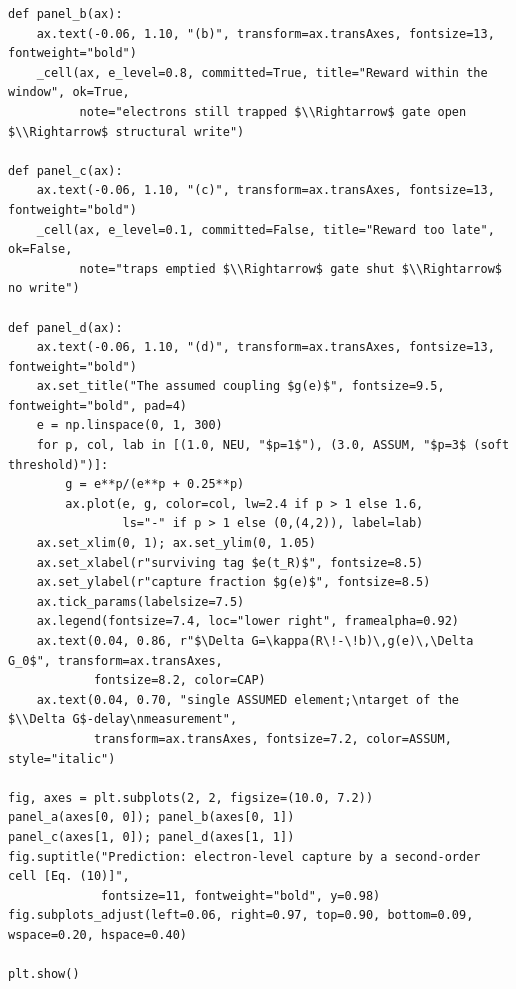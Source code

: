 \begin{lstlisting}[caption={schematics.ipynb code cell 3},label={lst:mrl-nb-schematics-3}]
def panel_b(ax):
    ax.text(-0.06, 1.10, "(b)", transform=ax.transAxes, fontsize=13, fontweight="bold")
    _cell(ax, e_level=0.8, committed=True, title="Reward within the window", ok=True,
          note="electrons still trapped $\\Rightarrow$ gate open $\\Rightarrow$ structural write")

def panel_c(ax):
    ax.text(-0.06, 1.10, "(c)", transform=ax.transAxes, fontsize=13, fontweight="bold")
    _cell(ax, e_level=0.1, committed=False, title="Reward too late", ok=False,
          note="traps emptied $\\Rightarrow$ gate shut $\\Rightarrow$ no write")

def panel_d(ax):
    ax.text(-0.06, 1.10, "(d)", transform=ax.transAxes, fontsize=13, fontweight="bold")
    ax.set_title("The assumed coupling $g(e)$", fontsize=9.5, fontweight="bold", pad=4)
    e = np.linspace(0, 1, 300)
    for p, col, lab in [(1.0, NEU, "$p=1$"), (3.0, ASSUM, "$p=3$ (soft threshold)")]:
        g = e**p/(e**p + 0.25**p)
        ax.plot(e, g, color=col, lw=2.4 if p > 1 else 1.6,
                ls="-" if p > 1 else (0,(4,2)), label=lab)
    ax.set_xlim(0, 1); ax.set_ylim(0, 1.05)
    ax.set_xlabel(r"surviving tag $e(t_R)$", fontsize=8.5)
    ax.set_ylabel(r"capture fraction $g(e)$", fontsize=8.5)
    ax.tick_params(labelsize=7.5)
    ax.legend(fontsize=7.4, loc="lower right", framealpha=0.92)
    ax.text(0.04, 0.86, r"$\Delta G=\kappa(R\!-\!b)\,g(e)\,\Delta G_0$", transform=ax.transAxes,
            fontsize=8.2, color=CAP)
    ax.text(0.04, 0.70, "single ASSUMED element;\ntarget of the $\\Delta G$-delay\nmeasurement",
            transform=ax.transAxes, fontsize=7.2, color=ASSUM, style="italic")

fig, axes = plt.subplots(2, 2, figsize=(10.0, 7.2))
panel_a(axes[0, 0]); panel_b(axes[0, 1])
panel_c(axes[1, 0]); panel_d(axes[1, 1])
fig.suptitle("Prediction: electron-level capture by a second-order cell [Eq. (10)]",
             fontsize=11, fontweight="bold", y=0.98)
fig.subplots_adjust(left=0.06, right=0.97, top=0.90, bottom=0.09, wspace=0.20, hspace=0.40)

plt.show()
\end{lstlisting}

